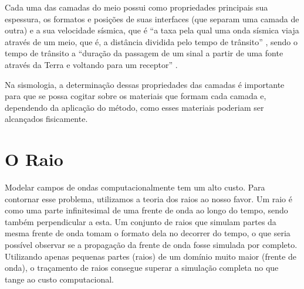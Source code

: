         Cada uma das camadas do meio possui como propriedades principais sua espessura, os formatos e posições de suas interfaces (que separam uma camada de outra) e a sua velocidade sísmica, que é ``a taxa pela qual uma onda sísmica viaja através de um meio, que é, a distância dividida pelo tempo de trânsito'' \cite{OilfieldGlossary:seismicVelocity}, sendo o tempo de trânsito a ``duração da passagem de um sinal a partir de uma fonte através da Terra e voltando para um receptor'' \cite{OilfieldGlossary:travelTime}.
        
        Na sismologia, a determinação dessas propriedades das camadas é importante para que se possa cogitar sobre os materiais que formam cada camada e, dependendo da aplicação do método, como esses materiais poderiam ser alcançados fisicamente.
    
    \section{O Raio}
    
        \label{raySec}
        
            Modelar campos de ondas computacionalmente tem um alto custo. Para contornar esse problema, utilizamos a teoria dos raios ao nosso favor. Um raio é como uma parte infinitesimal de uma frente de onda ao longo do tempo, sendo também perpendicular a esta. Um conjunto de raios que simulam partes da mesma frente de onda tomam o formato dela no decorrer do tempo, o que seria possível observar se a propagação da frente de onda fosse simulada por completo. Utilizando apenas pequenas partes (raios) de um domínio muito maior (frente de onda), o traçamento de raios consegue superar a simulação completa no que tange ao custo computacional.
    
